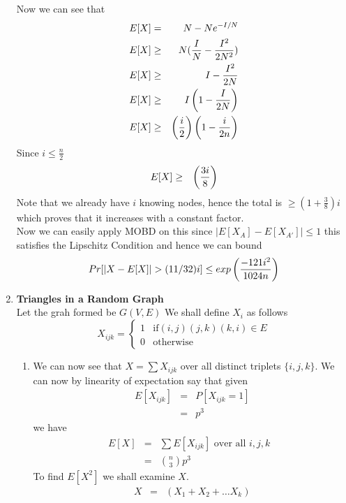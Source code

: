 \documentclass{assignment}
\begin{document}
\begin{problemlist}
\begin{problem}
\begin{answer}
\begin{enumerate}
Now we can see that \\
\begin{eqnarray}
 E[X] &=& N-Ne^{-I/N} \\
E[X] &\geq& N(\frac{I}{N}-\frac{I^2}{2N^2})\\
E[X] &\geq& I-{I^2 \over 2N}\\
E[X] &\geq& I\left(1-{I \over 2N}\right)\\
E[X] &\geq& \left(i \over 2\right) \left( 1 - {i \over 2n} \right) \\
\end{eqnarray}
Since $i\leq \frac{n}{2}$\\
\begin{eqnarray}
E[X] &\geq& \left(3i \over 8\right) \\
\end{eqnarray}
Note that we already have $i$ knowing nodes, hence the total is $\geq (1+\frac{3}{8})i$ which proves that it increases with a constant factor.\\
Now we can easily apply MOBD on this since $|E[X_A] - E[X_{A'}]| \leq 1$  this satisfies the Lipschitz Condition and hence we can bound 
\begin{eqnarray}
 Pr[|X-E[X]|>(11/32)i] \leq exp \left( { - 121 i^2 \over 1024 n} \right)
\end{eqnarray}
 \item  \textbf{Triangles in a Random Graph}\\Let the grah formed be $G(V,E)$ We shall define $X_i$ as follows 
\[
 X_{ijk} =  
\begin{cases}
 1 & \text{if} (i,j) (j,k) (k,i) \in E \\
 0 & \text{otherwise}
\end{cases}
\]
\begin{enumerate}
\item We can now see that $X = \sum X_{ijk}$ over all distinct triplets $\{i,j,k\}$. We can now by linearity of expectation say that given
\begin{eqnarray}
E[X_{ijk}] & = & P[X_{ijk} = 1] \\
 & = & p^3
\end{eqnarray}
we have
\begin{eqnarray}
 E[X] & = & \sum E[X_{ijk}] \text{ over all $i,j,k$ } \\
 & = & \binom{n}{3} p^3
\end{eqnarray}
To find $E[X^2]$ we shall examine $X$.
\begin{eqnarray}
 X & = & (X_1 + X_2 + \ldots X_k) \\

\end{eqnarray}
\end{enumerate}
\end{enumerate}
\end{answer}
\end{problem}
\end{problemlist}
\end{document}
